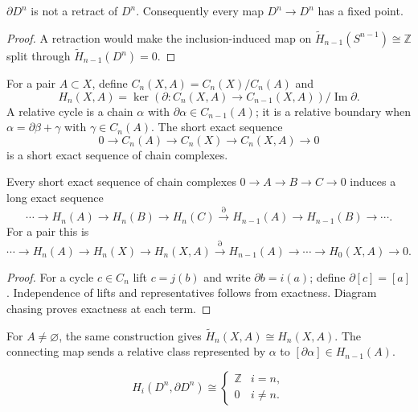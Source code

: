 \begin{corollary}
\label{cor:non-retraction-disk-boundary}
$\partial D^n$ is not a retract of $D^n$.  Consequently every map $D^n\to D^n$ has a fixed point.
\end{corollary}
\begin{proof}
\sketch A retraction would make the inclusion-induced map on $\widetilde H_{n-1}(S^{n-1})\cong\mathbb{Z}$ split through $\widetilde H_{n-1}(D^n)=0$.
\end{proof}

For a pair $A\subset X$, define $C_n(X,A)=C_n(X)/C_n(A)$ and
\[
H_n(X,A)=\ker(\partial:C_n(X,A)\to C_{n-1}(X,A))/\operatorname{Im}\partial.
\]
A relative cycle is a chain $\alpha$ with $\partial\alpha\in C_{n-1}(A)$; it is a relative boundary when $\alpha=\partial\beta+\gamma$ with $\gamma\in C_n(A)$.  The short exact sequence
\[
0\to C_n(A)\to C_n(X)\to C_n(X,A)\to0
\]
is a short exact sequence of chain complexes.

\begin{theorem}
\label{thm:long-exact-sequence-pair}
Every short exact sequence of chain complexes $0\to A\to B\to C\to0$ induces a long exact sequence
\[
\cdots\to H_n(A)\to H_n(B)\to H_n(C)\xrightarrow{\partial}H_{n-1}(A)\to H_{n-1}(B)\to\cdots.
\]
For a pair this is
\[
\cdots\to H_n(A)\to H_n(X)\to H_n(X,A)\xrightarrow{\partial}H_{n-1}(A)\to\cdots\to H_0(X,A)\to0.
\]
\end{theorem}
\begin{proof}
\sketch For a cycle $c\in C_n$ lift $c=j(b)$ and write $\partial b=i(a)$; define $\partial[c]=[a]$.  Independence of lifts and representatives follows from exactness.  Diagram chasing proves exactness at each term.
\end{proof}

For $A\ne\varnothing$, the same construction gives $\widetilde H_n(X,A)\cong H_n(X,A)$.  The connecting map sends a relative class represented by $\alpha$ to $[\partial\alpha]\in H_{n-1}(A)$.

\begin{example}
\label{ex:long-exact-sequence-disk-sphere}
\[
H_i(D^n,\partial D^n)\cong\begin{cases}\mathbb{Z}&i=n,\\0&i\ne n.\end{cases}
\]
\end{example}

